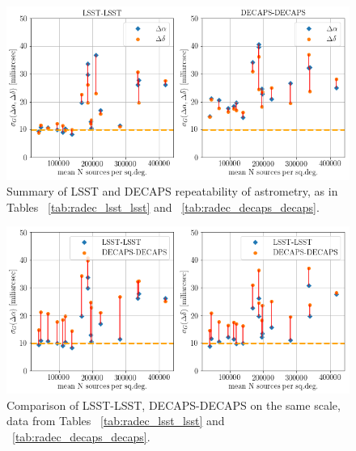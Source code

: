 \documentclass[DM,lsstdraft,toc,usenatbib]{lsstdoc}
\begin{document}
\begin{figure}
\begin{centering}
\includegraphics[width=0.8\columnwidth]{figs/Astrometry_LSST-LSST_DECAPS-DECAPS.png}
\caption{Summary of LSST and DECAPS repeatability of astrometry, as in Tables ~\ref{tab:radec_lsst_lsst} and ~\ref{tab:radec_decaps_decaps}.}
\label{fig:lsst_decaps_side}
\end{centering}
\end{figure} 



\begin{figure}
\begin{centering}
\includegraphics[width=0.8\columnwidth]{figs/Astrometry_DD-LL_ra_dec.png}
\caption{Comparison of LSST-LSST, DECAPS-DECAPS on the same scale, data from Tables ~\ref{tab:radec_lsst_lsst} and ~\ref{tab:radec_decaps_decaps}.}
\label{fig:lsst_decaps_panel}
\end{centering}
\end{figure} 
\end{document}
